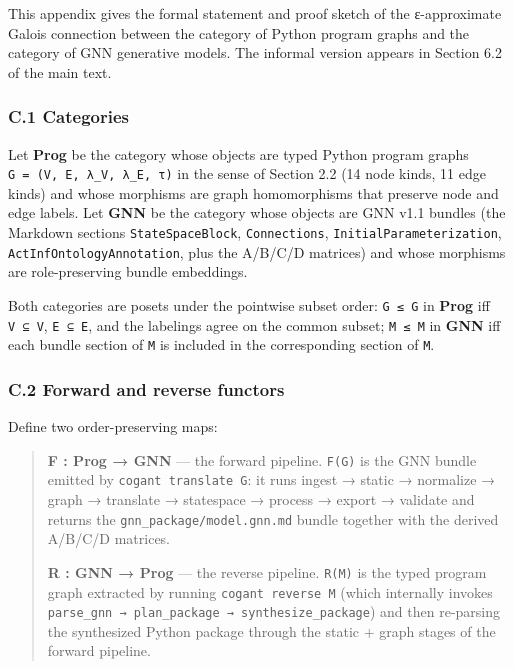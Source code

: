 \documentclass[
]{article}
\begin{document}
This appendix gives the formal statement and proof sketch of the
ε-approximate Galois connection between the category of Python program
graphs and the category of GNN generative models. The informal version
appears in Section 6.2 of the main text.

\subsubsection{C.1 Categories}\label{c.1-categories}

Let \textbf{Prog} be the category whose objects are typed Python program
graphs \texttt{G\ =\ (V,\ E,\ λ\_V,\ λ\_E,\ τ)} in the sense of Section
2.2 (14 node kinds, 11 edge kinds) and whose morphisms are graph
homomorphisms that preserve node and edge labels. Let \textbf{GNN} be
the category whose objects are GNN v1.1 bundles (the Markdown sections
\texttt{StateSpaceBlock}, \texttt{Connections},
\texttt{InitialParameterization}, \texttt{ActInfOntologyAnnotation},
plus the A/B/C/D matrices) and whose morphisms are role-preserving
bundle embeddings.

Both categories are posets under the pointwise subset order:
\texttt{G\ ≤\ G\textquotesingle{}} in \textbf{Prog} iff
\texttt{V\ ⊆\ V\textquotesingle{}}, \texttt{E\ ⊆\ E\textquotesingle{}},
and the labelings agree on the common subset;
\texttt{M\ ≤\ M\textquotesingle{}} in \textbf{GNN} iff each bundle
section of \texttt{M} is included in the corresponding section of
\texttt{M\textquotesingle{}}.

\subsubsection{C.2 Forward and reverse
functors}\label{c.2-forward-and-reverse-functors}

Define two order-preserving maps:

\begin{quote}
\textbf{F : Prog → GNN} --- the forward pipeline. \texttt{F(G)} is the
GNN bundle emitted by \texttt{cogant\ translate\ G}: it runs ingest →
static → normalize → graph → translate → statespace → process → export →
validate and returns the \texttt{gnn\_package/model.gnn.md} bundle
together with the derived A/B/C/D matrices.

\textbf{R : GNN → Prog} --- the reverse pipeline. \texttt{R(M)} is the
typed program graph extracted by running \texttt{cogant\ reverse\ M}
(which internally invokes
\texttt{parse\_gnn\ →\ plan\_package\ →\ synthesize\_package}) and then
re-parsing the synthesized Python package through the static + graph
stages of the forward pipeline.
\end{quote}
\end{document}
